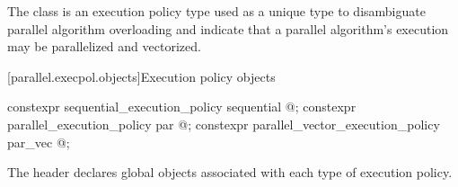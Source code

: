 \begin{itemdescr}
\pnum
The class  is an execution policy type
used as a unique type to disambiguate parallel algorithm overloading and
indicate that a parallel algorithm's execution may be parallelized and
vectorized.
\end{itemdescr}

[parallel.execpol.objects]{Execution policy objects}

%
%
%
\begin{itemdecl}
constexpr sequential_execution_policy      sequential{ @\unspec@ };
constexpr parallel_execution_policy        par{ @\unspec@ };
constexpr parallel_vector_execution_policy par_vec{ @\unspec@ };
\end{itemdecl}

\begin{itemdescr}
\pnum
The header  declares global objects associated with each type of execution policy.
\end{itemdescr}
